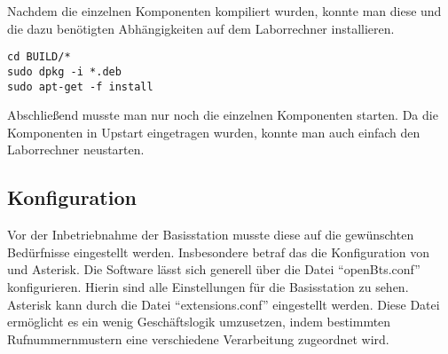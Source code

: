 Nachdem die einzelnen Komponenten kompiliert wurden, konnte man diese und die dazu benötigten Abhängigkeiten auf dem Laborrechner installieren.

\begin{lstlisting}
cd BUILD/*
sudo dpkg -i *.deb
sudo apt-get -f install
\end{lstlisting}

Abschließend musste man nur noch die einzelnen Komponenten starten. Da die Komponenten in Upstart eingetragen wurden, konnte man auch einfach den Laborrechner neustarten.

\subsection{Konfiguration}
\label{sec:konfiguration}
Vor der Inbetriebnahme der Basisstation musste diese auf die gewünschten Bedürfnisse eingestellt werden. Insbesondere betraf das die Konfiguration von \OpenBTS und Asterisk. Die Software \OpenBTS lässt sich generell über die Datei ``openBts.conf'' konfigurieren. Hierin sind alle Einstellungen für die Basisstation zu sehen. Asterisk kann durch die Datei ``extensions.conf'' eingestellt werden. Diese Datei ermöglicht es ein wenig Geschäftslogik umzusetzen, indem bestimmten Rufnummernmustern eine verschiedene Verarbeitung zugeordnet wird. \\

